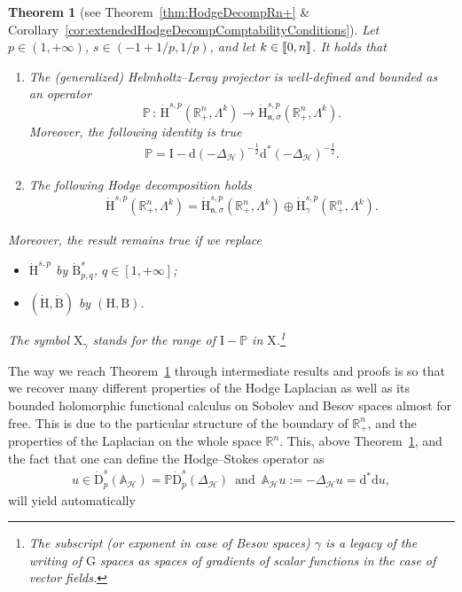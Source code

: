 \documentclass[10pt]{amsart}
\newtheorem{theo}{Theorem}[section]
\theoremstyle{definition}\newtheorem{defi}[theo]{Definition}\newtheorem{rema}[theo]{Remark}\newtheorem{exam}[theo]{Example}\newtheorem{exem}[theo]{Example}\newtheorem{nota}[theo]{Notation}
\newcommand{\bbP}{\mathbb{P}}
\newcommand{\bbA}{\mathbb{A}}
\newcommand{\bbR}{\mathbb{R}}
\newcommand{\rmH}{\mathrm{H}}%
\newcommand{\rmB}{\mathrm{B}}
\newcommand{\rmd}{\mathrm{d}}
\newcommand{\rmD}{\mathrm{D}}
\newcommand{\rmX}{\mathrm{X}}
\newcommand{\rmI}{\mathrm{I}}
\newcommand{\rmG}{\mathrm{G}}
\newcommand{\clH}{\mathcal{H}}
\newcommand{\fkn}{\mathfrak{n}}
\newcommand{\llbracket}{\mathopen{[\mkern -2.7mu[}}
\newcommand{\rrbracket}{\mathclose{]\mkern -2.7mu]}}
\newcommand{\llb}{\llbracket}
\newcommand{\rrb}{\rrbracket}
\begin{document}
\begin{theo}[{see Theorem~\ref{thm:HodgeDecompRn+} \& Corollary~\ref{cor:extendedHodgeDecompComptabilityConditions}}]\label{thm:HodgeDecompRn+Intro}
Let $p\in(1,+\infty)$, $s\in(-1+1/p,1/p)$, and let $k\in\llb 0,n\rrb$. It holds that
\begin{enumerate}
\item\label{theo1.1.1} The (generalized) Helmholtz--Leray projector is well-defined and bounded as an operator
\[
\bbP\,:\, \dot{\rmH}^{s,p}\left(\bbR^n_+,\Lambda^k\right)\longrightarrow \dot{\rmH}^{s,p}_{\fkn,\sigma}\left(\bbR^n_+,\Lambda^k\right).
\]
Moreover, the following identity is true
\begin{align*}
\bbP = \rmI  - \rmd(-\Delta_{\clH})^{-\frac{1}{2}}\rmd^\ast(-\Delta_{\clH})^{-\frac{1}{2}} .
\end{align*}

\item\label{theo1.1.2} The following Hodge decomposition holds
\begin{align*}
\dot{\rmH}^{s,p}\left(\bbR^n_+,\Lambda^k\right) = \dot{\rmH}^{s,p}_{\fkn,\sigma}\left(\bbR^n_+,\Lambda^k\right) \oplus \dot{\rmH}^{s,p}_{\gamma}\left(\bbR^n_+,\Lambda^k\right).
\end{align*}
\end{enumerate}
Moreover, the result remains true if we replace
\begin{itemize}
\item $\dot{\rmH}^{s,p}$ by $\dot{\rmB}^{s}_{p,q}$, $q\in[1,+\infty]$;
\item $(\dot{\rmH},\dot{\rmB})$ by $({\rmH},{\rmB})$.
\end{itemize}
The symbol $\rmX _\gamma$ stands for the range of $\rmI -\bbP$ in $\rmX $.\footnote{The subscript (or exponent in case of Besov spaces) $\gamma$ is a legacy of the writing of $\rmG $ spaces as spaces of gradients of scalar functions in the case of vector fields.}
\end{theo}


The way we reach Theorem~\ref{thm:HodgeDecompRn+Intro} through intermediate results and proofs is so that we recover many different properties of the Hodge Laplacian as well as its bounded holomorphic functional calculus on Sobolev and Besov spaces almost for free. This is due to the particular structure of the boundary of $\bbR^n_+$, and the properties of the Laplacian on the whole space $\bbR^n$. This, above Theorem~\ref{thm:HodgeDecompRn+Intro}, and the fact that one can define the Hodge--Stokes operator as
\begin{align*}
u\in \dot{\rmD}^{s}_{p}({\bbA_\clH}) = \bbP\dot{\rmD}^{s}_{p}({\Delta_\clH})\,\text{ and }\,\bbA_{\clH} u:= -{\Delta_\clH} u = \rmd^{\ast}\rmd u,
\end{align*}
will yield automatically
\end{document}
